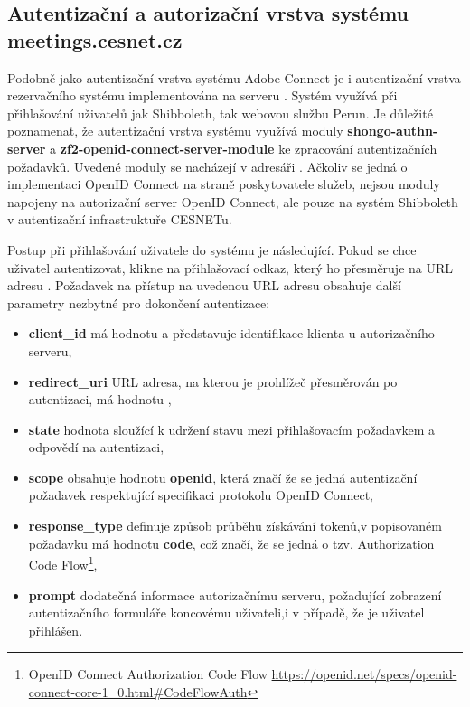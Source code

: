\documentclass[
  printed, %
  twoside, %
  table,   %
  nolof,     %
  nolot,     %
]{fithesis3}
\begin{document}
\subsection{Autentizační a autorizační vrstva systému meetings.cesnet.cz}
\label{meetings-old}
Podobně jako autentizační vrstva systému Adobe Connect je i autentizační vrstva rezervačního systému  implementována na serveru . Systém  využívá při přihlašování uživatelů jak Shibboleth, tak webovou službu Perun. Je důležité poznamenat, že autentizační vrstva systému  využívá moduly \textbf{shongo-authn-server} a \textbf{zf2-openid-connect-server-module} ke zpracování autentizačních požadavků. Uvedené moduly se nacházejí v adresáři . Ačkoliv se jedná o implementaci OpenID Connect na straně poskytovatele služeb, nejsou moduly napojeny na autorizační server OpenID Connect, ale pouze na systém Shibboleth v autentizační infrastruktuře CESNETu. \par

Postup při přihlašování uživatele do systému  je následující. Pokud se chce uživatel autentizovat, klikne na přihlašovací odkaz, který ho přesměruje na URL adresu . Požadavek na přístup na uvedenou URL adresu obsahuje další parametry nezbytné pro dokončení autentizace:
\label{shongo:state}
\begin{itemize}
    \item \textbf{client\_id} má hodnotu  a představuje identifikace klienta u autorizačního serveru,
    \item \textbf{redirect\_uri} URL adresa, na kterou je prohlížeč přesměrován po autentizaci, má hodnotu , 
    \item \textbf{state} hodnota sloužící k udržení stavu mezi přihlašovacím požadavkem a odpovědí na autentizaci, 
    \item \textbf{scope} obsahuje hodnotu \textbf{openid}, která značí že se jedná autentizační požadavek respektující specifikaci protokolu OpenID Connect,
    \item \textbf{response\_type} definuje způsob průběhu získávání tokenů,\break v popisovaném požadavku má hodnotu \textbf{code}, což značí, že se jedná o tzv. Authorization Code Flow\footnote{OpenID Connect Authorization Code Flow \url{https://openid.net/specs/openid-connect-core-1_0.html\#CodeFlowAuth}},
    \item \textbf{prompt} dodatečná informace autorizačnímu serveru, požadující zobrazení autentizačního formuláře koncovému uživateli,\break i v případě, že je uživatel přihlášen. 
\end{itemize}
\end{document}
